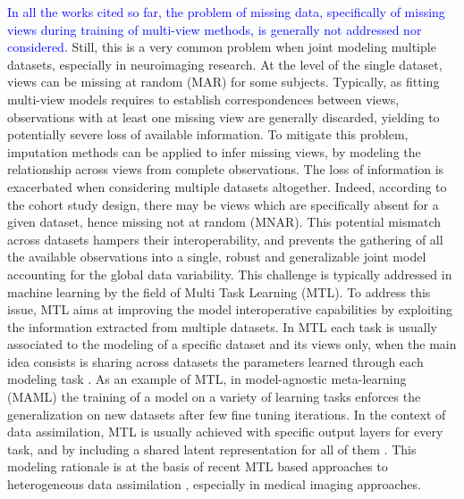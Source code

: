 \textcolor{blue}{
	 In all the works cited so far, the problem of missing data, specifically of missing views during training of multi-view methods, is generally not addressed nor considered.
}
Still, this is a very common problem when joint modeling multiple datasets, especially in neuroimaging research.
At the level of the single dataset, views can be missing at random (MAR) for some subjects.
Typically, as fitting multi-view models requires to establish correspondences between views, observations with at least one missing view are generally discarded, yielding to potentially severe loss of available information.
To mitigate this problem, imputation methods can be applied to infer missing views, by modeling the relationship across views from complete observations.
%
The loss of information is exacerbated when considering multiple datasets altogether.
Indeed, according to the cohort study design, there may be views which are specifically absent for a given dataset, hence missing not at random (MNAR).
This potential mismatch across datasets hampers their interoperability,
and prevents the gathering of all the available observations into a single, robust and generalizable joint model accounting for the global data variability.
%
This challenge is typically addressed in machine learning by the field of Multi Task Learning (MTL).
To address this issue, MTL aims at improving the model interoperative capabilities by exploiting the information extracted from multiple datasets.
In MTL each task is usually associated to the modeling of a specific dataset and its views only,
when the main idea consists is sharing across datasets the parameters learned through each modeling task \citep{Caruana1998, Dorado-Moreno2020}.
As an example of MTL, in model-agnostic meta-learning (MAML) \citep{MAML1} the training of a model on a variety of learning tasks enforces the generalization on new datasets after few fine tuning iterations.
%
In the context of data assimilation, MTL is usually achieved with specific output layers for every task, and by including a shared latent representation for all of them \citep{Dorado-Moreno2020}.
This modeling rationale is at the basis of recent MTL based approaches to heterogeneous data assimilation \citep{Wu2018, Shi2019},
especially in medical imaging approaches.
%
